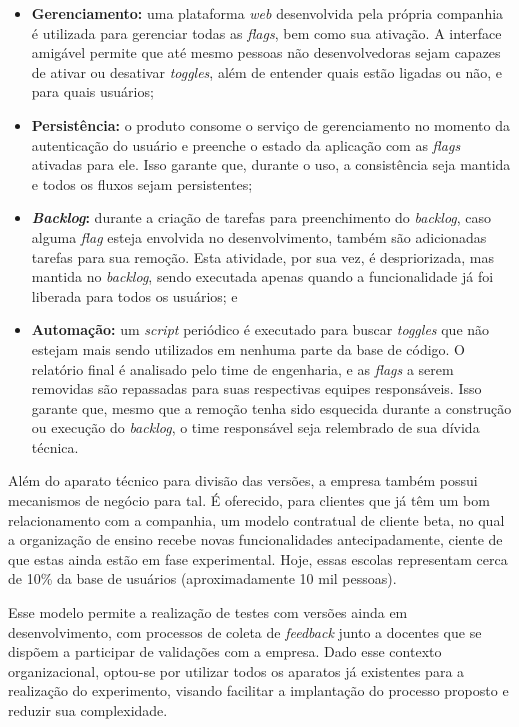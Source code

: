 \begin{itemize} 

    \item \textbf{Gerenciamento:} uma plataforma \textit{web} desenvolvida pela própria companhia é utilizada para gerenciar todas as \textit{flags}, bem como sua ativação. A interface amigável permite que até mesmo pessoas não desenvolvedoras sejam capazes de ativar ou desativar \textit{toggles}, além de entender quais estão ligadas ou não, e para quais usuários;
    
    \item \textbf{Persistência:} o produto consome o serviço de gerenciamento no momento da autenticação do usuário e preenche o estado da aplicação com as \textit{flags} ativadas para ele. Isso garante que, durante o uso, a consistência seja mantida e todos os fluxos sejam persistentes;
    
    \item \textbf{\textit{Backlog}:} durante a criação de tarefas para preenchimento do \textit{backlog}, caso alguma \textit{flag} esteja envolvida no desenvolvimento, também são adicionadas tarefas para sua remoção. Esta atividade, por sua vez, é despriorizada, mas mantida no \textit{backlog}, sendo executada apenas quando a funcionalidade já foi liberada para todos os usuários; e 
    
    \item \textbf{Automação:} um \textit{script} periódico é executado para buscar \textit{toggles} que não estejam mais sendo utilizados em nenhuma parte da base de código. O relatório final é analisado pelo time de engenharia, e as \textit{flags} a serem removidas são repassadas para suas respectivas equipes responsáveis. Isso garante que, mesmo que a remoção tenha sido esquecida durante a construção ou execução do \textit{backlog}, o time responsável seja relembrado de sua dívida técnica. 

\end{itemize}

Além do aparato técnico para divisão das versões, a empresa também possui mecanismos de negócio para tal. É oferecido, para clientes que já têm um bom relacionamento com a companhia, um modelo contratual de cliente beta, no qual a organização de ensino recebe novas funcionalidades antecipadamente, ciente de que estas ainda estão em fase experimental. Hoje, essas escolas representam cerca de 10\% da base de usuários (aproximadamente 10 mil pessoas).

Esse modelo permite a realização de testes com versões ainda em desenvolvimento, com processos de coleta de \textit{feedback} junto a docentes que se dispõem a participar de validações com a empresa. Dado esse contexto organizacional, optou-se por utilizar todos os aparatos já existentes para a realização do experimento, visando facilitar a implantação do processo proposto e reduzir sua complexidade.

